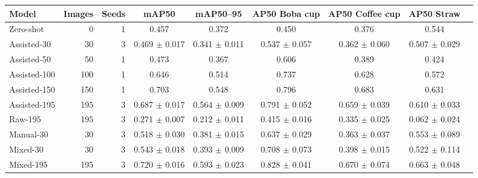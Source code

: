 \begin{tabular}{@{}lrrcccccc@{}}
\toprule
Model & Images & Seeds & mAP50 & mAP50--95 & AP50 Boba cup & AP50 Coffee cup & AP50 Straw \\
\midrule
Zero-shot & 0 & 1 & 0.457 & 0.372 & 0.450 & 0.376 & 0.544 \\
\midrule
Assisted-30 & 30 & 3 & 0.469 $\pm$ 0.017 & 0.341 $\pm$ 0.011 & 0.537 $\pm$ 0.057 & 0.362 $\pm$ 0.060 & 0.507 $\pm$ 0.029 \\
Assisted-50 & 50 & 1 & 0.473 & 0.367 & 0.606 & 0.389 & 0.424 \\
Assisted-100 & 100 & 1 & 0.646 & 0.514 & 0.737 & 0.628 & 0.572 \\
Assisted-150 & 150 & 1 & 0.703 & 0.548 & 0.796 & 0.683 & 0.631 \\
Assisted-195 & 195 & 3 & 0.687 $\pm$ 0.017 & 0.564 $\pm$ 0.009 & 0.791 $\pm$ 0.052 & 0.659 $\pm$ 0.039 & 0.610 $\pm$ 0.033 \\
\midrule
Raw-195 & 195 & 3 & 0.271 $\pm$ 0.007 & 0.212 $\pm$ 0.011 & 0.415 $\pm$ 0.016 & 0.335 $\pm$ 0.025 & 0.062 $\pm$ 0.024 \\
\midrule
Manual-30 & 30 & 3 & 0.518 $\pm$ 0.030 & 0.381 $\pm$ 0.015 & 0.637 $\pm$ 0.029 & 0.363 $\pm$ 0.037 & 0.553 $\pm$ 0.089 \\
\midrule
Mixed-30 & 30 & 3 & 0.543 $\pm$ 0.018 & 0.393 $\pm$ 0.009 & 0.708 $\pm$ 0.073 & 0.398 $\pm$ 0.015 & 0.522 $\pm$ 0.114 \\
Mixed-195 & 195 & 3 & 0.720 $\pm$ 0.016 & 0.593 $\pm$ 0.023 & 0.828 $\pm$ 0.041 & 0.670 $\pm$ 0.074 & 0.663 $\pm$ 0.048 \\
\bottomrule
\end{tabular}
